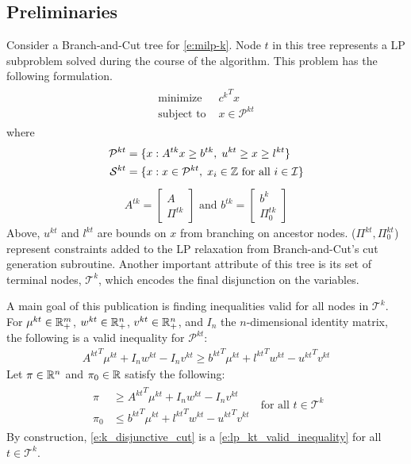 \documentclass[10pt]{article}
\begin{document}
	\subsection{Preliminaries} \label{ss:prelims}
	Consider a Branch-and-Cut tree for \ref{e:milp-k}. Node $ t $ in this tree represents a LP subproblem solved during the course of the algorithm. This problem has the following formulation.
	\begin{align}
		\begin{split}
			\text{minimize } & {c^k}^T x \\
			\text{subject to } & x \in \mathcal{P}^{kt}
		\end{split} \label{e:lp-kt} \tag{LP-$ kt $}
	\end{align}
	where
	\begin{align*}
		\mathcal{P}^{kt} &= \{x : A^{tk}x \geq b^{tk}, \; u^{kt} \geq x \geq l^{kt} \} \\
		\mathcal{S}^{kt} &= \{x : x \in \mathcal{P}^{kt}, \; x_i \in \mathbb{Z} \text{ for all } i \in \mathcal{I} \} \\
	\end{align*}
	\begin{align*}
		A^{tk} = \begin{bmatrix} A \\ \Pi^{tk} \end{bmatrix} \text{ and } b^{tk} = \begin{bmatrix} b^k \\ \Pi_0^{tk} \end{bmatrix}
	\end{align*}
	Above, $ u^{kt} $ and $ l^{kt} $ are bounds on $ x $ from branching on ancestor nodes. ($ \Pi^{kt}, \Pi_0^{kt} $) represent constraints added to the LP relaxation from Branch-and-Cut's cut generation subroutine. Another important attribute of this tree is its set of terminal nodes, $ \mathcal{T}^k $, which encodes the final disjunction on the variables.
	
	A main goal of this publication is finding inequalities valid for all nodes in $ \mathcal{T}^k $. For $ \mu^{kt} \in \mathbb{R}_+^{m}$, $ w^{kt} \in \mathbb{R}_+^{n}$, $ v^{kt} \in \mathbb{R}_+^{n} $, and $ I_n $ the $ n $-dimensional identity matrix, the following is a valid inequality for $ \mathcal{P}^{kt} $:
	\begin{align}
		{A^{kt}}^T \mu^{kt} + I_n w^{kt} - I_n v^{kt} \geq {b^{kt}}^T \mu^{kt} + {l^{kt}}^T w^{kt} - {u^{kt}}^T v^{kt} \label{e:lp_kt_valid_inequality} \tag{LP-$ kt $ valid inequality}
	\end{align}
	Let $ \pi \in \mathbb{R}^n $ and $ \pi_0 \in \mathbb{R} $ satisfy the following:
	\begin{align}
		\begin{split}
			\pi &\geq {A^{kt}}^T \mu^{kt} + I_n w^{kt} - I_n v^{kt} \\
			\pi_0 & \leq {b^{kt}}^T \mu^{kt} + {l^{kt}}^T w^{kt} - {u^{kt}}^T v^{kt}
		\end{split} \; \text{ for all } t \in \mathcal{T}^k \label{e:k_disjunctive_cut} \tag{$ k $-disjuctive cut}
	\end{align}
	By construction, \ref{e:k_disjunctive_cut} is a \ref{e:lp_kt_valid_inequality} for all $ t \in \mathcal{T}^k $.
	
\end{document}
